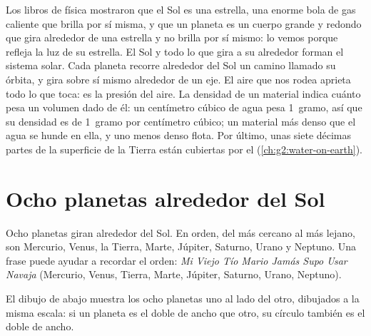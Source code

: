 \begin{recall}
Los libros de física mostraron que el Sol es una estrella, una enorme bola
de gas caliente que brilla por sí misma, y que un planeta es un cuerpo
grande y redondo que gira alrededor de una estrella y no brilla por sí
mismo: lo vemos porque refleja la luz de su estrella. El Sol y todo lo que
gira a su alrededor forman el sistema solar. Cada planeta recorre alrededor
del Sol un camino llamado su órbita, y gira sobre sí mismo alrededor de un
eje. El aire que nos rodea aprieta todo lo que toca: es la presión del
aire. La densidad de un material indica cuánto pesa un volumen dado de él:
un centímetro cúbico de agua pesa 1~gramo, así que su densidad es de
1~gramo por centímetro cúbico; un material más denso que el agua se hunde
en ella, y uno menos denso flota. Por último, unas siete décimas partes de
la superficie de la Tierra están cubiertas por el 
(\cref{ch:g2:water-on-earth}).
\end{recall}

\section{Ocho planetas alrededor del Sol}

Ocho planetas giran alrededor del Sol. En orden, del más cercano al más
lejano, son Mercurio, Venus, la Tierra, Marte, Júpiter, Saturno, Urano y
Neptuno. Una frase puede ayudar a recordar el orden: \emph{Mi Viejo Tío
Mario Jamás Supo Usar Navaja} (Mercurio, Venus, Tierra, Marte, Júpiter,
Saturno, Urano, Neptuno).

El dibujo de abajo muestra los ocho planetas uno al lado del otro,
dibujados a la misma escala: si un planeta es el doble de ancho que otro,
su círculo también es el doble de ancho.

